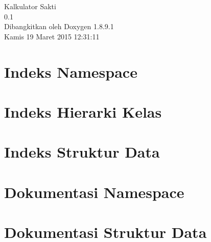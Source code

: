 \documentclass[twoside]{book}
\newcommand{\+}{\discretionary{\mbox{\scriptsize$\hookleftarrow$}}{}{}}
\newcommand{\clearemptydoublepage}{%
  \newpage{\pagestyle{empty}\cleardoublepage}%
}
\begin{document}
\hypersetup{pageanchor=false,
             bookmarks=true,
             bookmarksnumbered=true,
             pdfencoding=unicode
            }
\begin{titlepage}
\vspace*{7cm}
\begin{center}%
{\Large Kalkulator Sakti \\[1ex]\large 0.\+1 }\\
\vspace*{1cm}
{\large Dibangkitkan oleh Doxygen 1.8.9.1}\\
\vspace*{0.5cm}
{\small Kamis 19 Maret 2015 12:31:11}\\
\end{center}
\end{titlepage}
\clearemptydoublepage
\tableofcontents
\clearemptydoublepage
{}
\hypersetup{pageanchor=true}

\chapter{Indeks Namespace}

\chapter{Indeks Hierarki Kelas}

\chapter{Indeks Struktur Data}

\chapter{Dokumentasi Namespace}




\chapter{Dokumentasi Struktur Data}




















\backmatter
\newpage
{}
\clearemptydoublepage
{}
\printindex
\end{document}
